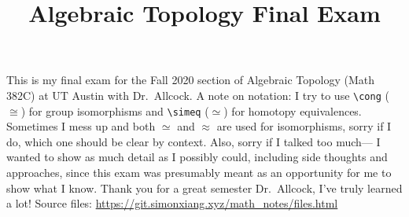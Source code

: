 \documentclass[fontsize=9pt]{article}
\title{Algebraic Topology Final Exam}
\begin{document}
\maketitle
This is my final exam for the Fall 2020 section of Algebraic Topology (Math 382C) at UT Austin with Dr.\ Allcock. A note on notation: I try to use \texttt{\textbackslash cong} ($\cong$) for group isomorphisms and \texttt{\textbackslash simeq} ($\simeq$) for homotopy equivalences. Sometimes I mess up and both $\simeq$ and $\approx$ are used for isomorphisms, sorry if I do, which one should be clear by context. Also, sorry if I talked too much— I wanted to show as much detail as I possibly could, including side thoughts and approaches, since this exam was presumably meant as an opportunity for me to show what I know. Thank you for a great semester Dr.\ Allcock, I've truly learned a lot! Source files: \url{https://git.simonxiang.xyz/math_notes/files.html} 
\tableofcontents
    
\end{document}
